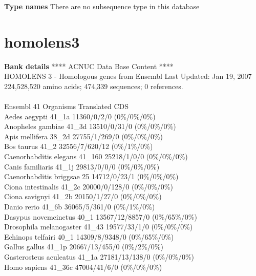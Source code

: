 \documentclass{article}
\begin{document}
\begin{Schunk}
\textbf{Type names}
There are no subsequence type in this database
\section{ homolens3 }
\textbf{Bank details}
               ****     ACNUC Data Base Content      ****                      \\
      HOMOLENS 3 - Homologous genes from Ensembl Last Updated: Jan 19, 2007\\
          224,528,520 amino acids; 474,339 sequences; 0 references.\\
	 \\
                        Ensembl 41 Organisms Translated CDS\\
Aedes aegypti                           41\_1a 11360/0/2/0 (0\%/0\%/0\%)\\
Anopheles gambiae                       41\_3d 13510/0/31/0 (0\%/0\%/0\%)\\
Apis mellifera                          38\_2d 27755/1/269/0 (0\%/0\%/0\%)\\
Bos taurus                              41\_2 32556/7/620/12 (0\%/1\%/0\%)\\
Caenorhabditis elegans                  41\_160 25218/1/0/0 (0\%/0\%/0\%)\\
Canis familiaris                        41\_1j 29813/0/0/0 (0\%/0\%/0\%)\\
Caenorhabditis briggsae                 25 14712/0/23/1 (0\%/0\%/0\%)\\
Ciona intestinalis                      41\_2c 20000/0/128/0 (0\%/0\%/0\%)\\
Ciona savignyi                          41\_2b 20150/1/27/0 (0\%/0\%/0\%)\\
Danio rerio                             41\_6b 36065/5/361/0 (0\%/1\%/0\%)\\
Dasypus novemcinctus                    40\_1 13567/12/8857/0 (0\%/65\%/0\%)\\
Drosophila melanogaster                 41\_43 19577/33/1/0 (0\%/0\%/0\%)\\
Echinops telfairi                       40\_1 14309/8/9348/0 (0\%/65\%/0\%)\\
Gallus gallus                           41\_1p 20667/13/455/0 (0\%/2\%/0\%)\\
Gasterosteus aculeatus                  41\_1a 27181/13/138/0 (0\%/0\%/0\%)\\
Homo sapiens                            41\_36c 47004/41/6/0 (0\%/0\%/0\%)\\

\end{Schunk}
\end{document}
